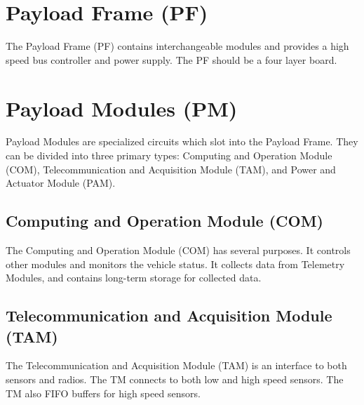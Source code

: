 \documentclass[12pt,article]{memoir}
\begin{document}
\section{Payload Frame (PF)}
The Payload Frame (PF) contains interchangeable modules and provides a high speed bus controller and power supply. The PF should be a four layer board.
\section{Payload Modules (PM)}
Payload Modules are specialized circuits which slot into the Payload Frame. They can be divided into three primary types: Computing and Operation Module (COM), Telecommunication and Acquisition Module (TAM), and Power and Actuator Module (PAM).
\subsection{Computing and Operation Module (COM)}
The Computing and Operation Module (COM) has several purposes. It controls other modules and monitors the vehicle status. It collects data from Telemetry Modules, and contains long-term storage for collected data. 
\subsection{Telecommunication and Acquisition Module (TAM)}
The Telecommunication and Acquisition Module (TAM) is an interface to both sensors and radios. The TM connects to both low and high speed sensors. The TM also FIFO buffers for high speed sensors.
\end{document}
